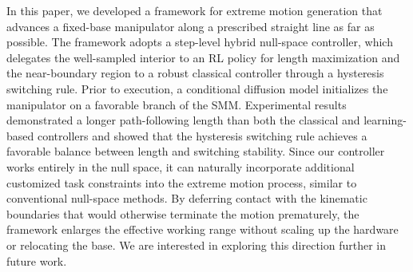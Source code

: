 \documentclass{svproc}
\newcommand{\rev}[1]{\begingroup\color{magenta}#1\endgroup}
\begin{document}
In this paper, we developed a framework for extreme motion generation that advances a fixed-base manipulator along a prescribed straight line as far as possible. The framework adopts a step-level hybrid null-space controller, which delegates the well-sampled interior to an RL policy for length maximization and the near-boundary region to a robust classical controller through a hysteresis switching rule. Prior to execution, a conditional diffusion model initializes the manipulator on a favorable branch of the SMM. Experimental results demonstrated a longer path-following length than both the classical and learning-based controllers and showed that the hysteresis switching rule achieves a favorable balance between length and switching stability. Since our controller works entirely in the null space, it can naturally incorporate additional customized task constraints into the extreme motion process, similar to conventional null-space methods. By deferring contact with the kinematic boundaries that would otherwise terminate the motion prematurely, the framework enlarges the effective working range without scaling up the hardware or relocating the base. We are interested in exploring this direction further in future work.


%
%
%
%         
%         






\end{document}

